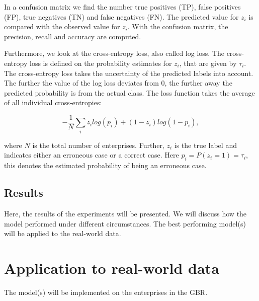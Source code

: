 \documentclass[12pt, a4paper, titlepage]{article}
\begin{document}
In a confusion matrix we find the number true positives (TP), false positives (FP), true negatives (TN) and false negatives (FN). The predicted value for $z_i$ is compared with the observed value for $z_i$. With the confusion matrix, the precision, recall and accuracy are computed. 

Furthermore, we look at the cross-entropy loss, also called log loss. The cross-entropy loss is defined on the probability estimates for $z_i$, that are given by $\tau_i$. The cross-entropy loss takes the uncertainty of the predicted labels into account. The further the value of the log loss deviates from 0, the further away the predicted probability is from the actual class. The loss function takes the average of all individual cross-entropies:
						
						\begin{equation}\label{logloss}
- \frac{1}{N} \sum_i z_i log(p_i) + (1-z_i) log (1-p_i),
						\end{equation}


where $N$ is the total number of enterprises. Further, $z_i$ is the true label and indicates either an erroneous case or a correct case. Here $p_i = P(z_i=1) = \tau_i$, this denotes the estimated probability of being an erroneous case. 

\bigskip

					\subsection{Results}
					\label{section:resultsexp}

Here, the results of the experiments will be presented. We will discuss how the model performed under different circumstances. The best performing model(s) will be applied to the real-world data.

					\section{Application to real-world data}
					\label{section:application}

The model(s) will be implemented on the enterprises in the GBR.




\clearpage %

 

\end{document}
